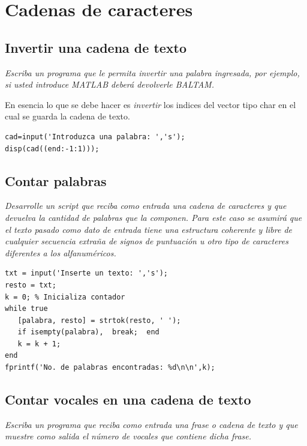 \chapter{Cadenas de caracteres}

\section{Invertir una cadena de texto}

\textit{Escriba un programa que le permita invertir una palabra ingresada, por ejemplo, si usted 
introduce MATLAB deberá devolverle BALTAM.}

\sol

En esencia lo que se debe hacer es \textit{invertir} los indices del vector tipo char en 
el cual se guarda la cadena de texto.

\begin{verbatim}
cad=input('Introduzca una palabra: ','s');
disp(cad((end:-1:1)));
\end{verbatim}

\section{Contar palabras}

\textit{Desarrolle un script que reciba como entrada una cadena de caracteres y que devuelva 
la cantidad de palabras que la componen. Para este caso se asumirá que el texto pasado como dato 
de entrada tiene una estructura coherente y libre de cualquier secuencia extraña de signos de 
puntuación u otro tipo de caracteres diferentes a los alfanuméricos.}

\sol

\begin{verbatim}
txt = input('Inserte un texto: ','s');
resto = txt;
k = 0; % Inicializa contador
while true
   [palabra, resto] = strtok(resto, ' ');
   if isempty(palabra),  break;  end
   k = k + 1;
end
fprintf('No. de palabras encontradas: %d\n\n',k);
\end{verbatim}


\section{Contar vocales en una cadena de texto}

\textit{Escriba un programa que reciba como entrada una frase o cadena de texto y que muestre como salida el número de vocales que contiene dicha frase.}

\sol

